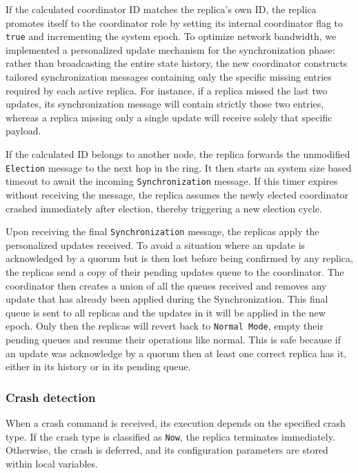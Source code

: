 If the calculated coordinator ID matches the replica's own ID, the replica promotes itself to the coordinator role by setting its internal coordinator flag to \texttt{true} and incrementing the system epoch. To optimize network bandwidth, we implemented a personalized update mechanism for the synchronization phase: rather than broadcasting the entire state history, the new coordinator constructs tailored synchronization messages containing only the specific missing entries required by each active replica. For instance, if a replica missed the last two updates, its synchronization message will contain strictly those two entries, whereas a replica missing only a single update will receive solely that specific payload.

If the calculated ID belongs to another node, the replica forwards the unmodified \texttt{Election} message to the next hop in the ring. It then starts an system size based timeout to await the incoming \texttt{Synchronization} message. If this timer expires without receiving the message, the replica assumes the newly elected coordinator crashed immediately after election, thereby triggering a new election cycle.

Upon receiving the final \texttt{Synchronization} message, the replicas apply the personalized updates received.
To avoid a situation where an update is acknowledged by a quorum but is then lost before being confirmed by any replica, the replicas send a copy of their pending updates queue to the coordinator. The coordinator then creates a union of all the queues received and removes any update that has already been applied during the Synchronization. This final queue is sent to all replicas and the updates in it will be applied in the new epoch.
Only then the replicas will revert back to \texttt{Normal Mode}, empty their pending queues and resume their operations like normal. This is safe because if an update was acknowledge by a quorum then at least one correct replica has it, either in its history or in its pending queue. 

\subsubsection{Crash detection}
When a crash command is received, its execution depends on the specified crash type. If the crash type is classified as \texttt{Now}, the replica terminates immediately. Otherwise, the crash is deferred, and its configuration parameters are stored within local variables.

